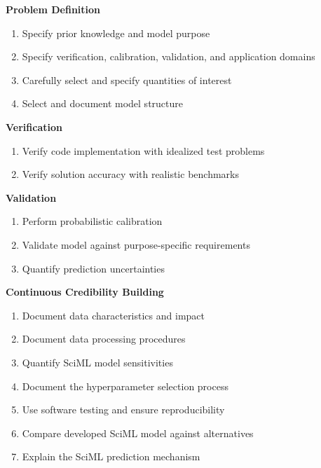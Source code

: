 \begin{tcolorbox}[
    title=Recommendations for Trustworthy Scientific Machine Learning,
    colback=white,
    colframe=qblue,
    colbacktitle=qblue,
    coltitle=white,
    fonttitle=\bfseries
]

\noindent\textbf{Problem Definition}
\begin{enumerate}
\item Specify prior knowledge and model purpose
\item Specify verification, calibration, validation, and application domains
\item Carefully select and specify quantities of interest
\item Select and document model structure
\end{enumerate}

\noindent\textbf{Verification}
\begin{enumerate}[resume]
\item Verify code implementation with idealized test problems
\item Verify solution accuracy with realistic benchmarks
\end{enumerate}

\noindent\textbf{Validation}
\begin{enumerate}[resume]
\item Perform probabilistic calibration
\item Validate model against purpose-specific requirements
\item Quantify prediction uncertainties
\end{enumerate}

\noindent\textbf{Continuous Credibility Building}
\begin{enumerate}[resume]
\item Document data characteristics and impact
\item Document data processing procedures
\item Quantify SciML model sensitivities
\item Document the hyperparameter selection process
\item Use software testing and ensure reproducibility
\item Compare developed SciML model against alternatives
\item Explain the SciML prediction mechanism
\end{enumerate}
\end{tcolorbox}
